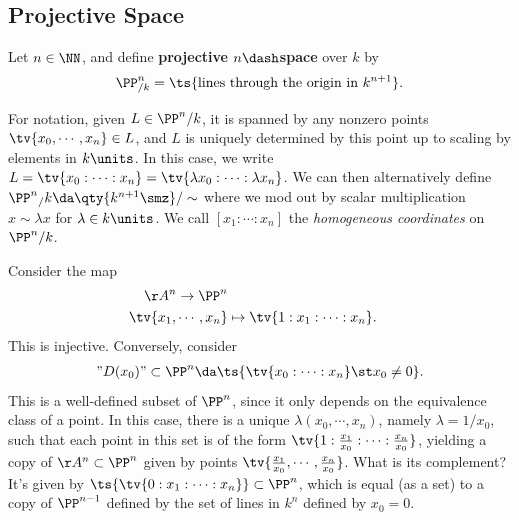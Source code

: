 \hypertarget{projective-space}{%
\subsection{Projective Space}\label{projective-space}}

\begin{definition}

Let \(n\in \NN\), and define \textbf{projective \(n\dash\)space} over
\(k\) by\\
\begin{align*}  
\PP^n_{/k} = \ts{\text{lines through the origin in } k^{n+1}}
.\end{align*}

\end{definition}

\begin{remark}

For notation, given \(L\in \PP^n/k\), it is spanned by any nonzero
points \(\tv{x_0, \cdots, x_n} \in L\), and \(L\) is uniquely determined
by this point up to scaling by elements in \(k\units\). In this case, we
write
\(L = \tv{x_0: \cdots : x_n} = \tv{\lambda x_0: \cdots : \lambda x_n}\).
We can then alternatively define
\(\PP^n{_/k} \da \qty{ k^{n+1}\smz} / \sim\) where we mod out by scalar
multiplication \(x\sim \lambda x\) for \(\lambda\in k\units\). We call
\([x_1 : \cdots : x_n]\) the \emph{homogeneous coordinates} on
\(\PP^n/k\).

\end{remark}

\begin{remark}

Consider the map
\begin{align*}  
\AA^n \to \PP^n \\
\tv{x_1, \cdots, x_n} &\mapsto \tv{1: x_1 : \cdots : x_n}
.\end{align*} This is injective. Conversely, consider
\begin{align*}  
"D(x_0)" \subset \PP^n \da \ts{\tv{x_0 : \cdots : x_n} \st x_0\neq 0}
.\end{align*} This is a well-defined subset of \(\PP^n\), since it only
depends on the equivalence class of a point. In this case, there is a
unique \(\lambda(x_0, \cdots, x_n)\), namely \(\lambda = 1/x_0\), such
that each point in this set is of the form
\(\tv{1: {x_1\over x_0} : \cdots : {x_n \over x_0}}\), yielding a copy
of \(\AA^n\subset \PP^n\) given by points
\(\tv{{x_1\over x_0}, \cdots, {x_n\over x_0}}\). What is its complement?
It's given by \(\ts{\tv{0: x_1: \cdots : x_n}} \subset \PP^n\), which is
equal (as a set) to a copy of \(\PP^{n-1}\) defined by the set of lines
in \(k^n\) defined by \(x_0 = 0\).

\end{remark}

